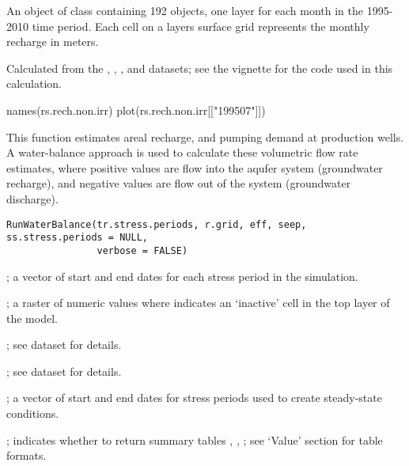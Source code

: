 \documentclass[letterpaper]{book}
\begin{document}
%
\begin{Format}
An object of  class containing 192  objects, one layer for each month in the 1995-2010 time period.
Each cell on a layers surface grid represents the monthly recharge in meters.
\end{Format}
%
\begin{Source}\relax
Calculated from the , , , and  datasets;
see the  vignette for the \R{} code used in this calculation.
\end{Source}
%
\begin{Examples}
\begin{ExampleCode}
names(rs.rech.non.irr)
plot(rs.rech.non.irr[["199507"]])
\end{ExampleCode}
\end{Examples}
%
\begin{Description}\relax
This function estimates areal recharge, and pumping demand at production wells.
A water-balance approach is used to calculate these volumetric flow rate estimates,
where positive values are flow into the aqufer system (groundwater recharge),
and negative values are flow out of the system (groundwater discharge).
\end{Description}
%
\begin{Usage}
\begin{verbatim}
RunWaterBalance(tr.stress.periods, r.grid, eff, seep, ss.stress.periods = NULL,
                verbose = FALSE)
\end{verbatim}
\end{Usage}
%
\begin{Arguments}
\begin{ldescription}
\item[\code{tr.stress.periods}] ; a vector of start and end dates for each stress period in the simulation.
\item[\code{r.grid}] ; a raster of numeric values where  indicates an `inactive' cell in the top layer of the model.
\item[\code{eff}] ; see  dataset for details.
\item[\code{seep}] ; see  dataset for details.
\item[\code{ss.stress.periods}] ; a vector of start and end dates for stress periods used to create steady-state conditions.
\item[\code{verbose}] ; indicates whether to return summary tables , , ;
see `Value' section for table formats.
\end{ldescription}
\end{Arguments}
\end{document}
